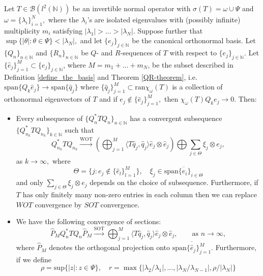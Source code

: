 \documentclass[a4paper,10pt]{article}
\begin{document}
\begin{theorem}\label{new_QR} Let $T \in \mathcal{B}(l^2(\mathbb{N}))$ be an invertible normal operator with $\sigma(T) = \omega \cup \Psi$ and $\omega = \{\lambda_i\}_{i=1}^N,$ where the $\lambda_i$'s are isolated eigenvalues with (possibly infinite) multiplicity $m_i$ satisfying $|\lambda_1| > \hdots > |\lambda_N|.$ Suppose further that $\sup\{|\theta|:\theta \in \Psi\} < |\lambda_N|,$ and let $\{e_j\}_{j\in\mathbb{N}}$ be the canonical orthonormal basis. Let $\{Q_n\}_{n\in\mathbb{N}}$ and $\{R_n\}_{n\in\mathbb{N}}$ be $Q$- and $R$-sequences of $T$ with respect to $\{e_j\}_{j\in\mathbb{N}}.$ Let $\{\hat e_j\}_{j=1}^M \subset \{e_j\}_{j\in\mathbb{N}}$, where $M = m_1 + \hdots +m_N$, be the subset described in Definition \ref{define_the_basis} and Theorem \ref{QR-theorem}, i.e. $\mathrm{span}\{Q_k \hat e_j\} \rightarrow\mathrm{span}\{\hat q_j\}$ where $\{\hat q_j\}_{j=1}^M\subset\mathrm{ran}\chi_{\omega}(T)$ is a collection of orthonormal eigenvectors of $T$ and if $e_j \notin \{\hat e_j\}_{j=1}^M,$ then $\chi_{\omega}(T)Q_ke_j \rightarrow 0.$ Then: 
\begin{itemize}
\item[(i)] Every subsequence of 
$\{Q_n^*TQ_n\}_{n\in\mathbb{N}}$ has a convergent subsequence 
$\{Q_{n_k}^*TQ_{n_k}\}_{k\in\mathbb{N}}$ such that 
\begin{equation*}
Q_{n_k}^*TQ_{n_k} \stackrel{\text{WOT}}{\longrightarrow} \left(\bigoplus_{j=1}^{M} \langle T\hat q_j,\hat q_j\rangle\hat e_j \otimes \hat e_j \right) \bigoplus \sum_{j \in \Theta} \xi_j \otimes e_j, 
\end{equation*}
as $k \rightarrow \infty,$ where
$$
\Theta = \{j: e_j \notin \{\hat e_l\}_{l=1}^M\}, \quad \xi_j \in \overline{\mathrm{span}\{e_i\}_{i\in\Theta}}$$
and only $\sum_{j \in \Theta} \xi_j \otimes e_j$ depends on the choice of subsequence. Furthermore, if $T$ has only finitely many non-zero entries in each column then we can replace $WOT$ convergence by $SOT$ convergence.
\item[(ii)] We have the following convergence of sections:
$$
\widehat P_{M} Q_n^*TQ_n\widehat P_{M}  \stackrel{\text{SOT}}{\longrightarrow} \bigoplus_{j=1}^{M} \langle T\hat q_j,\hat q_j\rangle\hat e_j \otimes \hat e_j ,\qquad \text{as }n \rightarrow \infty,
$$
where $\widehat P_M$ denotes the orthogonal projection onto $\overline{\mathrm{span}\{\hat e_j\}_{j=1}^M}$. Furthermore, if we define
$$
\rho=\mathrm{sup}\{\left|z\right|:z\in\Psi\},\quad r=\max\{\left|\lambda_2/\lambda_1\right|,...,\left|\lambda_N/\lambda_{N-1}\right|,\rho/\left|\lambda_N\right|\}
$$
\end{itemize}
\end{theorem}
\end{document}
